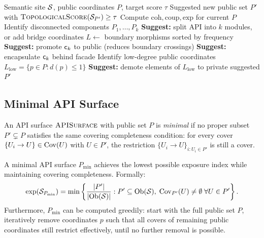 \documentclass[11pt]{article}
\newcommand{\APISurface}{\textsc{APISurface}}
\newcommand{\TopoScore}{\textsc{TopologicalScore}}
\newcommand{\CohIndex}{\mathrm{coh}}
\newcommand{\CoupIndex}{\mathrm{coup}}
\newcommand{\ExpIndex}{\mathrm{exp}}
\begin{document}
\begin{algorithm}[H]
\caption{Topology-Guided API Improvement}\label{alg:api-improve}
\begin{algorithmic}[1]
\REQUIRE Semantic site $\mathcal{S}$, public coordinates $P$, target score $\tau$
\ENSURE Suggested new public set $P'$ with $\TopoScore(\Site_{P'}) \geq \tau$
\STATE Compute $\CohIndex, \CoupIndex, \ExpIndex$ for current $P$
\IF{$\CohIndex < \tau_{\mathrm{coh}}$}
  \STATE Identify disconnected components $P_1, \ldots, P_k$
  \STATE \textbf{Suggest:} split API into $k$ modules, or add bridge coordinates
\ENDIF
\IF{$\CoupIndex > \tau_{\mathrm{coup}}$}
  \STATE $L \leftarrow$ boundary morphisms sorted by frequency
      \STATE \textbf{Suggest:} promote $\mathsf{c}_k$ to public (reduces boundary crossings)
    \ELSE
      \STATE \textbf{Suggest:} encapsulate $\mathsf{c}_k$ behind facade
    \ENDIF
  \ENDFOR
\ENDIF
\IF{$\ExpIndex > \tau_{\mathrm{exp}}$}
  \STATE Identify low-degree public coordinates $L_{\mathrm{low}} = \{p \in P : d(p) \leq 1\}$
  \STATE \textbf{Suggest:} demote elements of $L_{\mathrm{low}}$ to private
\ENDIF
\RETURN suggested $P'$
\end{algorithmic}
\end{algorithm}

\subsection{Minimal API Surface}

\begin{definition}\label{def:minimal-api}
An API surface $\APISurface$ with public set $P$ is \emph{minimal} if no
proper subset $P' \subsetneq P$ satisfies the same covering completeness
condition: for every cover $\{U_i \to U\} \in \mathrm{Cov}(U)$ with $U \in P'$,
the restriction $\{U_i \to U\}_{i : U_i \in P'}$ is still a cover.
\end{definition}

\begin{theorem}\label{thm:optimal-exposure}
A minimal API surface $P_{\min}$ achieves the lowest possible exposure
index while maintaining covering completeness.  Formally:
\[
  \ExpIndex(\Site_{P_{\min}}) = \min \left\{ \frac{|P'|}{|\Ob(\Site)|}
    : P' \subseteq \Ob(\Site),\; \Cov_{P'}(U) \neq \emptyset
    \;\forall U \in P' \right\}.
\]
Furthermore, $P_{\min}$ can be computed greedily: start with the full
public set $P$, iteratively remove coordinates $p$ such that all covers
of remaining public coordinates still restrict effectively, until no
further removal is possible.
\end{theorem}
\end{document}
